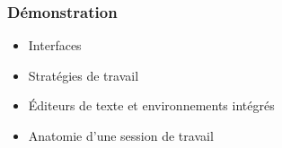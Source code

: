 \begin{frame}
  \frametitle{Démonstration}
  \begin{itemize}
  \item Interfaces
  \item Stratégies de travail
  \item Éditeurs de texte et environnements intégrés
  \item Anatomie d'une session de travail
  \end{itemize}

\end{frame}

